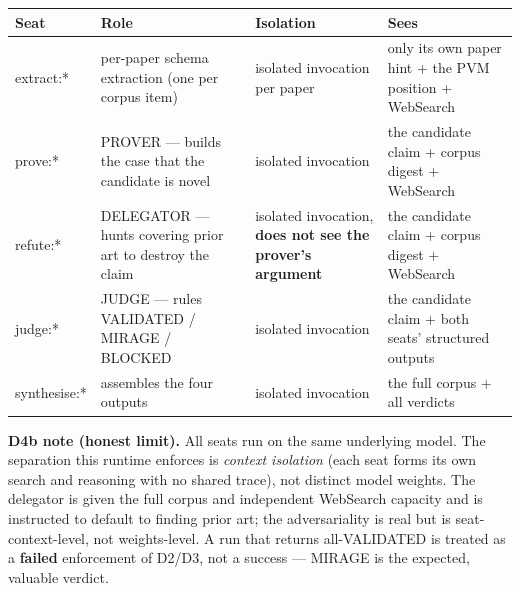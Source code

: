 \documentclass[
  11pt,
]{article}
\newcounter{none} %
\begin{document}
{\def\LTcaptype{none} %
\begin{longtable}[]{@{}
  >{\raggedright\arraybackslash}p{}
  >{\raggedright\arraybackslash}p{}
  >{\raggedright\arraybackslash}p{}
  >{\raggedright\arraybackslash}p{}@{}}
\toprule\noalign{}
\begin{minipage}[b]{\linewidth}\raggedright
Seat
\end{minipage} & \begin{minipage}[b]{\linewidth}\raggedright
Role
\end{minipage} & \begin{minipage}[b]{\linewidth}\raggedright
Isolation
\end{minipage} & \begin{minipage}[b]{\linewidth}\raggedright
Sees
\end{minipage} \\
\midrule\noalign{}
\endhead
\bottomrule\noalign{}
\endlastfoot
extract:* & per-paper schema extraction (one per corpus item) & isolated
invocation per paper & only its own paper hint + the PVM position +
WebSearch \\
prove:* & PROVER --- builds the case that the candidate is novel &
isolated invocation & the candidate claim + corpus digest + WebSearch \\
refute:* & DELEGATOR --- hunts covering prior art to destroy the claim &
isolated invocation, \textbf{does not see the prover's argument} & the
candidate claim + corpus digest + WebSearch \\
judge:* & JUDGE --- rules VALIDATED / MIRAGE / BLOCKED & isolated
invocation & the candidate claim + both seats' structured outputs \\
synthesise:* & assembles the four outputs & isolated invocation & the
full corpus + all verdicts \\
\end{longtable}
}

\textbf{D4b note (honest limit).} All seats run on the same underlying
model. The separation this runtime enforces is \emph{context isolation}
(each seat forms its own search and reasoning with no shared trace), not
distinct model weights. The delegator is given the full corpus and
independent WebSearch capacity and is instructed to default to finding
prior art; the adversariality is real but is seat-context-level, not
weights-level. A run that returns all-VALIDATED is treated as a
\textbf{failed} enforcement of D2/D3, not a success --- MIRAGE is the
expected, valuable verdict.
\end{document}
